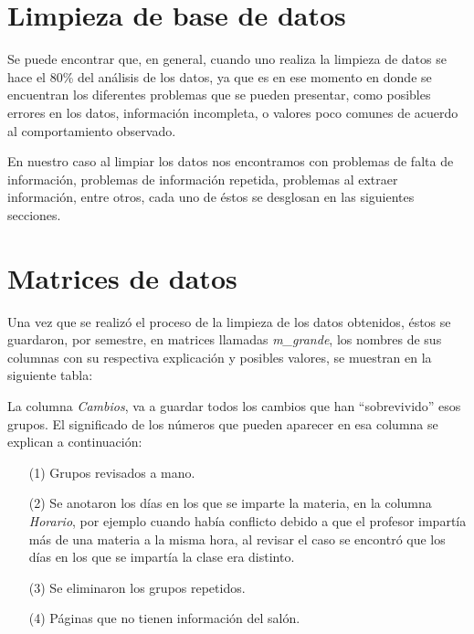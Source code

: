 \section{Limpieza de base de datos}

Se puede encontrar que, en general, cuando uno realiza la limpieza de datos se hace el 80\% del análisis de los datos, ya que es en ese momento en donde se encuentran los diferentes problemas que se pueden presentar, como posibles errores en los datos, información incompleta, o valores poco comunes de acuerdo al comportamiento observado.

En nuestro caso al limpiar los datos nos encontramos con problemas de falta de información, problemas de información repetida, problemas al extraer información, entre otros, cada uno de éstos se desglosan en las siguientes secciones.


\section{Matrices de datos}

Una vez que se realizó el proceso de la limpieza de los datos obtenidos, éstos se guardaron, por semestre, en matrices llamadas \textit{m\_grande}, los nombres de sus columnas con su respectiva explicación y posibles valores, se muestran en la siguiente tabla:

\dfNmatrizGrande %

La columna \textit{Cambios}, va a guardar todos los cambios que han ``sobrevivido'' esos grupos. El significado de los números que pueden aparecer en esa columna se explican a continuación:

\begin{enumerate}
\item[(1)] Grupos revisados a mano.

\item[(2)] Se anotaron los días en los que se imparte la materia, en la columna \textit{Horario}, por ejemplo cuando había conflicto debido a que el profesor impartía más de una materia a la misma hora, al revisar el caso se encontró que los días en los que se impartía la clase era distinto.

\item[(3)] Se eliminaron los grupos repetidos.

\item[(4)] Páginas que no tienen información del salón.
\end{enumerate}
